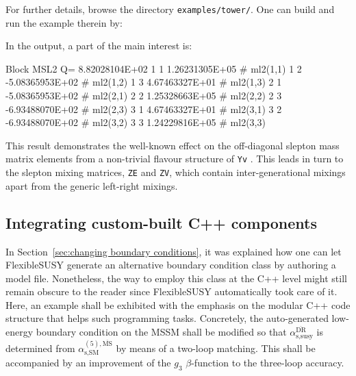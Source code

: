 \documentclass[final,3p,11pt,pdflatex]{elsarticle}
\makeatletter
\newcommand{\fs}{FlexibleSUSY\@\xspace}
\newcommand{\code}[1]{\lstinline|#1|}  %
\newcommand{\textoverline}[1]{$\overline{\mbox{#1}}$}
\newcommand{\DRbar}{\textoverline{DR}\xspace}
\newcommand{\MSbar}{\textoverline{MS}\xspace}
\newcommand{\secref}[1]{Section~\ref{#1}}
\makeatother
\begin{document}
For further details, browse the directory \code{examples/tower/}.
One can build and run the example therein by:
In the output,
a part of the main interest is:
\begin{numlstlisting}
Block MSL2 Q= 8.82028104E+02
  1  1     1.26231305E+05   # ml2(1,1)
  1  2    -5.08365953E+02   # ml2(1,2)
  1  3     4.67463327E+01   # ml2(1,3)
  2  1    -5.08365953E+02   # ml2(2,1)
  2  2     1.25328663E+05   # ml2(2,2)
  2  3    -6.93488070E+02   # ml2(2,3)
  3  1     4.67463327E+01   # ml2(3,1)
  3  2    -6.93488070E+02   # ml2(3,2)
  3  3     1.24229816E+05   # ml2(3,3)
\end{numlstlisting}
This result demonstrates the well-known effect on
the off-diagonal slepton mass matrix elements
from a non-trivial flavour structure of \code{Yv}
\cite{Borzumati:1986qx}.
This leads in turn to the slepton mixing
matrices, \code{ZE} and \code{ZV},
which contain inter-generational mixings apart from the
generic left-right mixings.

\subsection{Integrating custom-built C++ components}
\label{sec:integrating-custom-built}

In \secref{sec:changing boundary conditions},
it was explained how one can let \fs generate
an alternative boundary condition class
by authoring a model file.
Nonetheless, the way to employ this class at the C++ level
might still remain obscure to the reader
since \fs automatically took care of it.
Here, an example shall be exhibited
with the emphasis on the modular C++ code structure
that helps such programming tasks.
Concretely,
the auto-generated low-energy boundary condition on the MSSM
shall be modified so that
$\alpha_{,}^{\text{\DRbar}}$
is determined from
$\alpha_{,}^{(5),\text{\MSbar}}$
by means of a two-loop matching.
This shall be accompanied by an improvement
of the $g_3$ $\beta$-function to the three-loop accuracy.
\end{document}
